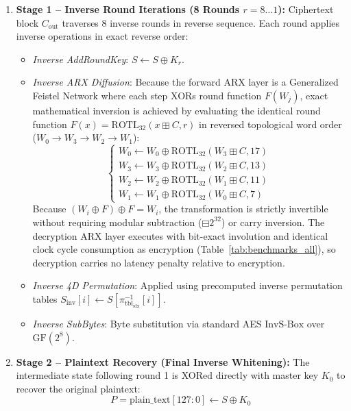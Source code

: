 \documentclass[review,12pt]{elsarticle}
\begin{document}
\begin{enumerate}
    \item \textbf{Stage 1 -- Inverse Round Iterations (8 Rounds $r = 8 \dots 1$):} Ciphertext block $C_{\text{out}}$ traverses 8 inverse rounds in reverse sequence. Each round applies inverse operations in exact reverse order:
    \begin{itemize}
        \item \emph{Inverse AddRoundKey}: $S \leftarrow S \oplus K_r$.
        \item \emph{Inverse ARX Diffusion}: Because the forward ARX layer is a Generalized Feistel Network where each step XORs round function $F(W_j)$, exact mathematical inversion is achieved by evaluating the identical round function $F(x) = \text{ROTL}_{32}(x \boxplus C, r)$ in reversed topological word order ($W_0 \to W_3 \to W_2 \to W_1$):
        \begin{equation}
        \begin{cases}
            W_0 \leftarrow W_0 \oplus \text{ROTL}_{32}(W_3 \boxplus C, 17) \\
            W_3 \leftarrow W_3 \oplus \text{ROTL}_{32}(W_2 \boxplus C, 13) \\
            W_2 \leftarrow W_2 \oplus \text{ROTL}_{32}(W_1 \boxplus C, 11) \\
            W_1 \leftarrow W_1 \oplus \text{ROTL}_{32}(W_0 \boxplus C, 7)
        \end{cases}
        \end{equation}
        Because $(W_i \oplus F) \oplus F = W_i$, the transformation is strictly invertible without requiring modular subtraction ($\boxminus 2^{32}$) or carry inversion. The decryption ARX layer executes with bit-exact involution and identical clock cycle consumption as encryption (Table~\ref{tab:benchmarks_all}), so decryption carries no latency penalty relative to encryption.
        \item \emph{Inverse 4D Permutation}: Applied using precomputed inverse permutation tables $S_{\text{inv}}[i] \leftarrow S[\pi_{\text{tbl}_{\text{idx}}}^{-1}[i]]$.
        \item \emph{Inverse SubBytes}: Byte substitution via standard AES $\text{InvS-Box}$ over $\text{GF}(2^8)$.
    \end{itemize}
    
    \item \textbf{Stage 2 -- Plaintext Recovery (Final Inverse Whitening):} The intermediate state following round 1 is XORed directly with master key $K_0$ to recover the original plaintext:
    \begin{equation}
        P = \text{plain\_text}[127:0] \leftarrow S \oplus K_0
    \end{equation}
\end{enumerate}
\end{document}
